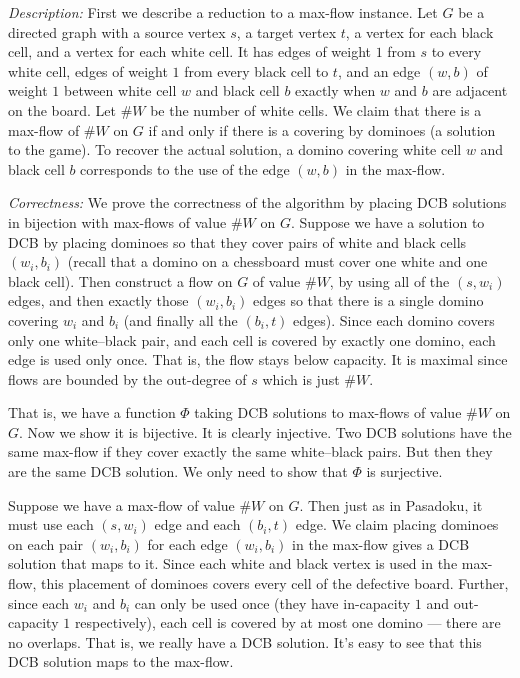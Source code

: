 \documentclass[12 pt, letterpaper]{hmcpset}
\begin{document}
\begin{solution}
	\emph{Description:} First we describe a reduction to a max-flow instance. Let $G$ be a directed graph with a source vertex $s$, a target vertex $t$, a vertex for each black cell, and a vertex for each white cell. It has edges of weight $1$ from $s$ to every white cell, edges of weight $1$ from every black cell to $t$, and an edge $(w, b)$ of weight $1$ between white cell $w$ and black cell $b$ exactly when $w$ and $b$ are adjacent on the board. Let $\# W$ be the number of white cells. We claim that there is a max-flow of $\#W$ on $G$ if and only if there is a covering by dominoes (a solution to the game). To recover the actual solution, a domino covering white cell $w$ and black cell $b$ corresponds to the use of the edge $(w, b)$ in the max-flow.

	\emph{Correctness:} We prove the correctness of the algorithm by placing DCB solutions in bijection with max-flows of value $\# W$ on $G$. Suppose we have a solution to DCB by placing dominoes so that they cover pairs of white and black cells $(w_{i}, b_{i})$ (recall that a domino on a chessboard must cover one white and one black cell). Then construct a flow on $G$ of value $\# W$, by using all of the $(s, w_{i})$ edges, and then exactly those $(w_{i}, b_{i})$ edges so that there is a single domino covering $w_{i}$ and $b_{i}$ (and finally all the $(b_{i}, t)$ edges). Since each domino covers only one white--black pair, and each cell is covered by exactly one domino, each edge is used only once. That is, the flow stays below capacity. It is maximal since flows are bounded by the out-degree of $s$ which is just $\# W$.

	That is, we have a function $\Phi$ taking DCB solutions to max-flows of value $\# W$ on $G$. Now we show it is bijective. It is clearly injective. Two DCB solutions have the same max-flow if they cover exactly the same white--black pairs. But then they are the same DCB solution. We only need to show that $\Phi$ is surjective.
 
	Suppose we have a max-flow of value $\# W$ on $G$. Then just as in Pasadoku, it must use each $(s, w_{i})$ edge and each $(b_{i}, t)$ edge. We claim placing dominoes on each pair $(w_{i}, b_{i})$ for each edge $(w_{i}, b_{i})$ in the max-flow gives a DCB solution that maps to it. Since each white and black vertex is used in the max-flow, this placement of dominoes covers every cell of the defective board. Further, since each $w_{i}$ and $b_{i}$ can only be used once (they have in-capacity $1$ and out-capacity $1$ respectively), each cell is covered by at most one domino --- there are no overlaps. That is, we really have a DCB solution. It's easy to see that this DCB solution maps to the max-flow.


\end{solution}
\end{document}
